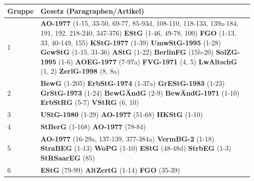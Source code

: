 \begin{tabular}{p{1.2cm}p{8.5cm}}
\toprule
Gruppe & Gesetz (Paragraphen/Artikel) \\
\midrule
1 & \textbf{AO-1977} (1-15, 33-50, 69-77, 85-93d, 108-110, 118-133, 139a-184, 191, 192, 218-240, 347-376) \textbf{EStG} (1-46, 49-78, 100) \textbf{FGO} (1-13, 33, 40-149, 155) \textbf{KStG-1977} (1-39) \textbf{UmwStG-1995} (1-28) \textbf{GewStG} (1-15, 31-36) \textbf{AStG} (1-22) \textbf{BerlinFG} (15b-20) \textbf{SolZG-1995} (1-6) \textbf{AOEG-1977} (7-97a) \textbf{FVG-1971} (4, 5) \textbf{LwAltschG} (1, 2) \textbf{ZerlG-1998} (8, 8a)  \\ 
2 & \textbf{BewG} (1-205) \textbf{ErbStG-1974} (1-37a) \textbf{GrEStG-1983} (1-23) \textbf{GrStG-1973} (1-24) \textbf{BewGÄndG} (2-9) \textbf{BewÄndG-1971} (1-10) \textbf{ErbStRG} (5-7) \textbf{VStRG} (6, 10)  \\ 
3 & \textbf{UStG-1980} (1-29) \textbf{AO-1977} (51-68) \textbf{HKStG} (1-10)  \\ 
4 & \textbf{StBerG} (1-168) \textbf{AO-1977} (78-84)  \\ 
5 & \textbf{AO-1977} (16-29a, 137-139, 377-384a) \textbf{VermBG-2} (1-18) \textbf{StraBEG} (1-13) \textbf{WoPG} (1-10) \textbf{EStG} (48-48d) \textbf{StrbEG} (1-3) \textbf{StRSaarEG} (85)  \\ 
6 & \textbf{EStG} (79-99) \textbf{AltZertG} (1-14) \textbf{FGO} (35-39) \\ 
\bottomrule
\end{tabular}
    